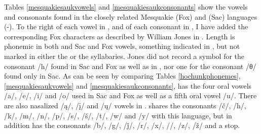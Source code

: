 \documentclass[output=paper]{LSP/langsci}
\begin{document}
\largerpage
Tables \ref{mesquakiesaukvowels} and \ref{mesquakiesaukconsonants} show the vowels and consonants found in the closely related Mes\-qua\-kie (Fox) and  (Sac) languages (-). To the right of each vowel in , and of each consonant in , I have added the corresponding Fox  characters as described by William Jones in \citeyear{Jones1906}. Length is phonemic in both  and Sac and Fox vowels, something indicated in , but not marked in either the  or the  syllabaries. Jones did not record a  symbol for the consonant /h/ found in Sac and Fox as well as in , nor one for the consonant /θ/ found only in Sac. As can be seen by comparing Tables \ref{hochunkphonemes}, \ref{mesquakiesaukvowels} and \ref{mesquakiesaukconsonants},  has the four oral vowels /a/, /e/, /i/ and /o/ used in Sac and Fox as well as a fifth  oral vowel /u/. There are also nasalized /\k{a}/, /\k{i}/ and /\k{u}/ vowels in .  shares the consonants /č/, /h/, /k/, /m/, /n/, /p/, /s/, /\v{s}/, /t/, /w/ and /y/ with this  language, but in addition has the consonants /b/, /g/, /\v{j}/, /r/, /x/, //, /z/, /\v{z}/ and a  stop.
\end{document}
